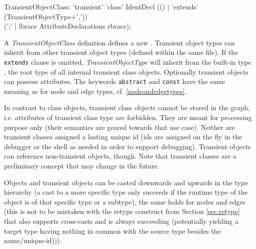 \begin{rail}
  TransientObjectClass: 'transient' 'class' IdentDecl (() | 'extends' (TransientObjectType+',')) \\
    (';' | lbrace AttributeDeclarations rbrace);
\end{rail}
A \emph{TransientObjectClass} definition defines a new .
Transient object types can inherit from other transient object types (defined within the same file).
If the \texttt{extends} clause is omitted, \emph{TransientObjectType} will inherit from the built-in type \texttt{}, the root type of all internal transient class objects.
Optionally transient objects can possess attributes.
The keywords \texttt{abstract} and \texttt{const} have the same meaning as for node and edge types, cf. \ref{nodeandedgetypes}.

In contrast to class objects, transient class objects cannot be stored in the graph, i.e. attributes of transient class type are forbidden.
They are meant for processing purpose only (their semantics are geared towards that use case).
Neither are transient classes assigned a lasting unique id (ids are assigned on the fly in the debugger or the shell as needed in order to support debugging).
Transient objects can reference non-transient objects, though.
Note that transient classes are a preliminary concept that may change in the future.

Objects and transient objects can be casted downwards and upwards in the type hierarchy (a cast to a more specific type only succeeds if the runtime type of the object is of that specific type or a subtype), the same holds for nodes and edges (this is not to be mistaken with the retype construct from Section \ref{sec:retype} that also supports cross-casts and is always succeeding (potentially yielding a target type having nothing in common with the source type besides the name/unique-id))).


